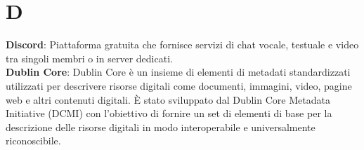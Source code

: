 \section{D}
\textbf{Discord}: Piattaforma gratuita che fornisce servizi di chat vocale, testuale e video tra singoli membri o in server dedicati.\\
\textbf{Dublin Core}: Dublin Core è un insieme di elementi di metadati standardizzati utilizzati per descrivere risorse digitali come documenti, immagini, video, pagine web e altri contenuti digitali. È stato sviluppato dal Dublin Core Metadata Initiative (DCMI) con l'obiettivo di fornire un set di elementi di base per la descrizione delle risorse digitali in modo interoperabile e universalmente riconoscibile.
